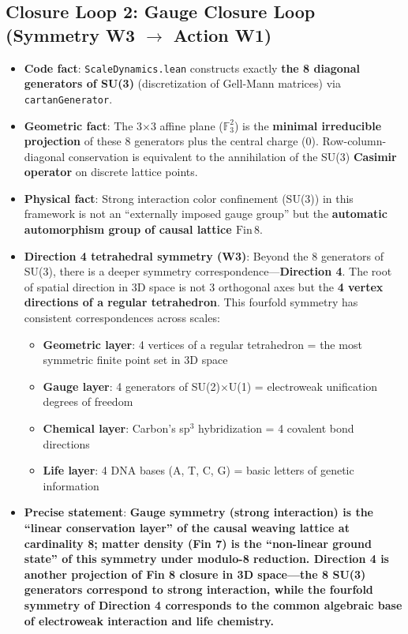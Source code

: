 \documentclass[aps,prd,twocolumn,nofootinbib,floatfix]{revtex4-2}
\begin{document}
\subsection{Closure Loop 2: Gauge Closure Loop (Symmetry W3 $\to$ Action W1)}

\begin{itemize}
    \item \textbf{Code fact}: \texttt{ScaleDynamics.lean} constructs exactly \textbf{the 8 diagonal generators of SU(3)} (discretization of Gell-Mann matrices) via \texttt{cartanGenerator}.
    \item \textbf{Geometric fact}: The 3$\times$3 affine plane ($\mathbb{F}_3^2$) is the \textbf{minimal irreducible projection} of these 8 generators plus the central charge (0). Row-column-diagonal conservation is equivalent to the annihilation of the SU(3) \textbf{Casimir operator} on discrete lattice points.
    \item \textbf{Physical fact}: Strong interaction color confinement (SU(3)) in this framework is not an ``externally imposed gauge group'' but the \textbf{automatic automorphism group of causal lattice $\text{Fin}\,8$}.
    \item \textbf{Direction 4 tetrahedral symmetry (W3)}: Beyond the 8 generators of SU(3), there is a deeper symmetry correspondence---\textbf{Direction 4}. The root of spatial direction in 3D space is not 3 orthogonal axes but the \textbf{4 vertex directions of a regular tetrahedron}. This fourfold symmetry has consistent correspondences across scales:
    \begin{itemize}
        \item \textbf{Geometric layer}: 4 vertices of a regular tetrahedron = the most symmetric finite point set in 3D space
        \item \textbf{Gauge layer}: 4 generators of SU(2)$\times$U(1) = electroweak unification degrees of freedom
        \item \textbf{Chemical layer}: Carbon's sp$^3$ hybridization = 4 covalent bond directions
        \item \textbf{Life layer}: 4 DNA bases (A, T, C, G) = basic letters of genetic information
    \end{itemize}
    \item \textbf{Precise statement}: \textbf{Gauge symmetry (strong interaction) is the ``linear conservation layer'' of the causal weaving lattice at cardinality 8; matter density (Fin 7) is the ``non-linear ground state'' of this symmetry under modulo-8 reduction. Direction 4 is another projection of Fin 8 closure in 3D space---the 8 SU(3) generators correspond to strong interaction, while the fourfold symmetry of Direction 4 corresponds to the common algebraic base of electroweak interaction and life chemistry.}
\end{itemize}
\end{document}
